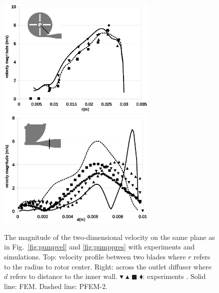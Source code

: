 \begin{figure}[htbp]
    \centering
    \includegraphics[width=3in]{imgs/nozzle_pump/pump_velblade.eps}\\
    \vspace{.5cm}
    \includegraphics[width=3in]{imgs/nozzle_pump/pump_veldiffuser.eps}
    \caption{The magnitude of the two-dimensional velocity on the same plane as in Fig.~\ref{fig:pumpvel} and \ref{fig:pumppres} with experiments and simulations. Top: velocity profile between two blades where $r$ refers to the radius to rotor center. Right: across the outlet diffuser where $d$ refers to distance to the inner wall. $\blacktriangledown$ $\blacktriangle$ $\blacksquare$ $\blacklozenge$: experiments \cite{mali_cfd}. Solid line: FEM. Dashed line: PFEM-2. }
    \label{fig:pumpvelprofile}
\end{figure}
